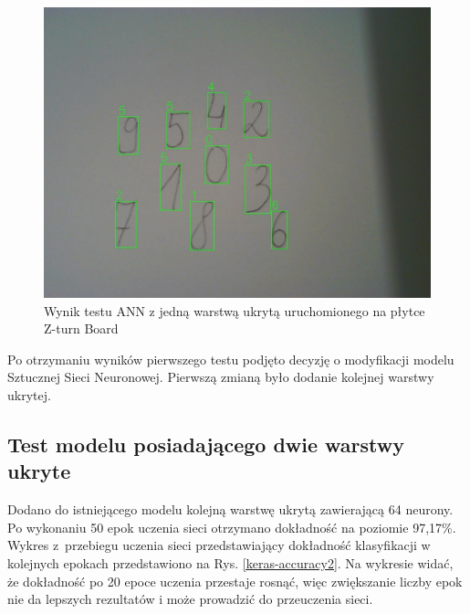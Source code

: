 \begin{figure}[!h]
    \centering
    \includegraphics[width=\textwidth]{img/1hid-layer-zturn-img.jpg}
    \caption{Wynik testu ANN z jedną warstwą ukrytą uruchomionego na płytce Z-turn Board}
    \label{1hid-layer-zturn-img}
\end{figure}

Po otrzymaniu wyników pierwszego testu podjęto decyzję o modyfikacji modelu Sztucznej Sieci Neuronowej. Pierwszą zmianą było dodanie kolejnej warstwy ukrytej.

\subsection{Test modelu posiadającego dwie warstwy ukryte}

Dodano do istniejącego modelu kolejną warstwę ukrytą zawierającą 64 neurony. Po wykonaniu 50 epok uczenia 
sieci otrzymano dokładność na poziomie 97,17\%. Wykres z~przebiegu uczenia sieci przedstawiający dokładność 
klasyfikacji w kolejnych epokach przedstawiono na Rys. \ref{keras-accuracy2}. Na wykresie widać, że dokładność
po 20 epoce uczenia przestaje rosnąć, więc zwiększanie liczby epok nie da lepszych rezultatów i może prowadzić do 
przeuczenia sieci.   

